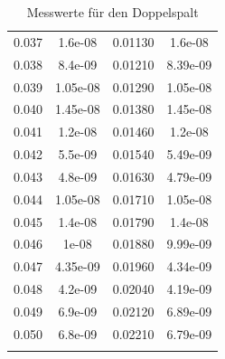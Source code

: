 \documentclass[11pt,ngerman,a4paper]{article}
\begin{document}
\begin{longtable}{SSSS}
0.037 & 1.6e-08 & 0.01130 & 1.6e-08\\
0.038 & 8.4e-09 & 0.01210 & 8.39e-09\\
0.039 & 1.05e-08 & 0.01290 & 1.05e-08\\
0.040 & 1.45e-08 & 0.01380 & 1.45e-08\\
0.041 & 1.2e-08 & 0.01460 & 1.2e-08\\
0.042 & 5.5e-09 & 0.01540 & 5.49e-09\\
0.043 & 4.8e-09 & 0.01630 & 4.79e-09\\
0.044 & 1.05e-08 & 0.01710 & 1.05e-08\\
0.045 & 1.4e-08 & 0.01790 & 1.4e-08\\
0.046 & 1e-08 & 0.01880 & 9.99e-09\\
0.047 & 4.35e-09 & 0.01960 & 4.34e-09\\
0.048 & 4.2e-09 & 0.02040 & 4.19e-09\\
0.049 & 6.9e-09 & 0.02120 & 6.89e-09\\
0.050 & 6.8e-09 & 0.02210 & 6.79e-09\\
\bottomrule
\caption{Messwerte für den Doppelspalt}
\end{longtable}
\end{document}
